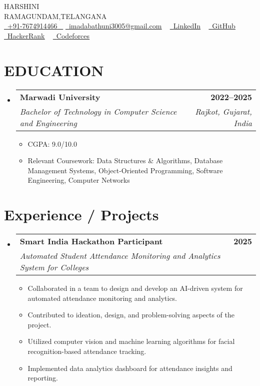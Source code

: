 \documentclass[letterpaper,11pt]{article}
\makeatletter
\newcommand{\resumeItem}[1]{
  \item\small{
    {#1 \vspace{-2pt}}
  }
}
\newcommand{\resumeSubheading}[4]{
  \vspace{-2pt}\item
    \begin{tabular*}{1.0\textwidth}[t]{l@{\extracolsep{\fill}}r}
      \textbf{\large#1} & \textbf{\small #2} \\
      \textit{\large#3} & \textit{\small #4} \\
     
    \end{tabular*}\vspace{-7pt}
}
\newcommand{\resumeSubHeadingListStart}{\begin{itemize}[leftmargin=0.0in, label={}]}
\newcommand{\resumeSubHeadingListEnd}{\end{itemize}}
\newcommand{\resumeItemListStart}{\begin{itemize}}
\newcommand{\resumeItemListEnd}{\end{itemize}\vspace{-5pt}}
\makeatother
\begin{document}




\begin{center}
    {\Huge \scshape HARSHINI} \\ \vspace{1pt}
    RAMAGUNDAM,TELANGANA \\ \vspace{1pt}
  \small \href{tel:+917674914466}{ \raisebox{-0.1\height}\faPhone\ \underline{+91-7674914466} ~} \href{mailto:imadabathuni3005@gmail.com}{\raisebox{-0.2\height}\faEnvelope\  \underline{imadabathuni3005@gmail.com}} ~
    \href{https://www.linkedin.com/in/imadabathuni-harshini-2782ab321}{\raisebox{-0.2\height}\faLinkedinSquare\ \underline{LinkedIn}}  ~
    \href{https://github.com/harshini-imadabathuni}{\raisebox{-0.2\height}\faGithub\ \underline{GitHub}} ~
    \href{https://www.hackerrank.com/harshini-imadabathuni}{\raisebox{-0.2\height}\faHackerrank\ \underline{HackerRank}} ~
    \href{https://codeforces.com/profile/harshini-imadabathuni}{\raisebox{-0.2\height}\faPoll\ \underline{Codeforces}}
    \vspace{-8pt}
\end{center}




\section{EDUCATION}
  \resumeSubHeadingListStart
    \resumeSubheading
      {Marwadi University}{2022--2025}
      {Bachelor of Technology in Computer Science and Engineering}{Rajkot, Gujarat, India}
      \resumeItemListStart
        \resumeItem{CGPA: 9.0/10.0}
        \resumeItem{Relevant Coursework: Data Structures \& Algorithms, Database Management Systems, Object-Oriented Programming, Software Engineering, Computer Networks}
      \resumeItemListEnd
  \resumeSubHeadingListEnd
 


    
\section{Experience / Projects}
\resumeSubHeadingListStart
  \resumeSubheading
    {Smart India Hackathon Participant}{2025}
    {Automated Student Attendance Monitoring and Analytics System for Colleges}{}
    \resumeItemListStart
      \resumeItem{Collaborated in a team to design and develop an AI-driven system for automated attendance monitoring and analytics.}
      \resumeItem{Contributed to ideation, design, and problem-solving aspects of the project.}
      \resumeItem{Utilized computer vision and machine learning algorithms for facial recognition-based attendance tracking.}
      \resumeItem{Implemented data analytics dashboard for attendance insights and reporting.}
    \resumeItemListEnd
\resumeSubHeadingListEnd
\end{document}
